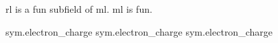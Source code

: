 \documentclass[a4paper]{article}
\begin{document}
\Acrfull{rl} is a fun subfield of \acrlong{ml}. \acrshort{ml} is fun.
\printnoidxglossary[type=acronym]

\gls{sym.electron_charge}
\Gls{sym.electron_charge}
\glsdesc{sym.electron_charge}
\end{document}
